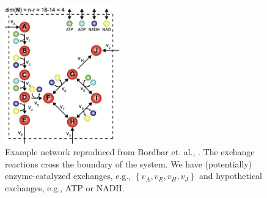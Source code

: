\documentclass{article}[11pt]
\begin{document}
\begin{figure}
   \centering
 \includegraphics[width=0.44\textwidth]{./figs/Fig-ExchangeReactions.png}
 \caption{Example network reproduced from Bordbar et. al., \citep{Bordbar:2014aa}.
 The exchange reactions cross the boundary of the system. We have (potentially) enzyme-catalyzed 
 exchanges, e.g., $\left\{v_{A},v_{E}, v_{H}, v_{J}\right\}$ and hypothetical exchanges, e.g., ATP or NADH.}\label{fig:example-exchange-reactions}
\end{figure}
\end{document}
